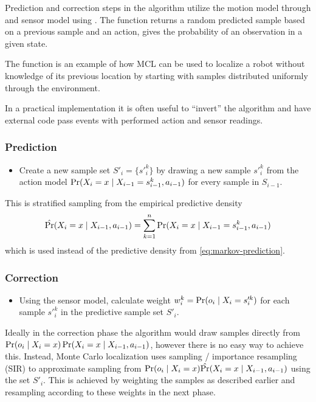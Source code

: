 Prediction and correction steps in the algorithm utilize the motion
model through \sampleFromActionModel{} and sensor model using \observationProbability{}.
The function \sampleFromActionModel{} returns a random predicted sample based on a previous sample and an action,
\observationProbability{} gives the probability of an observation in a given state.

The \initialize{} function is an example of how MCL can be used to localize
a robot without knowledge of its previous location by starting with samples distributed
uniformly through the environment.

In a practical implementation it is often useful to \enquote{invert} the algorithm and
have external code pass events with performed action and sensor readings.

\subsubsection{Prediction}
\begin{itemize}
\item
Create a new sample set \(S'_i = \{s'^k_{i}\} \)
by drawing a new sample \(s'^k_{i}\)
from the action model \(\operatorname{\mathrm{Pr}}(X_i = x \mid X_{i-1} = s^k_{i-1}, a_{i - 1})\)
for every sample in \(S_{i-1}\).
\end{itemize}

This is stratified sampling from the empirical predictive density
\begin{equation}
	\label{eq:mcl-predictive-density}
	\hat{\operatorname{\mathrm{Pr}}}(X_i = x \mid X_{i - 1}, a_{i - 1}) =
	\sum_{k = 1}^n \operatorname{\mathrm{Pr}}(X_i = x \mid X_{i-1} = s^k_{i-1}, a_{i - 1})
\end{equation}
which is used instead of the predictive density from \eqref{eq:markov-prediction}.

\subsubsection{Correction}
\begin{itemize}
\item
Using the sensor model, calculate weight \(w^k_i = \operatorname{\mathrm{Pr}}(o_i \mid X_i = s'^k_i)\)
for each sample \(s'^k_i\) in the predictive sample set \(S'_i\).
\end{itemize}

Ideally in the correction phase the algorithm would draw samples directly from
\(\operatorname{\mathrm{Pr}}(o_i \mid X_i = x) \operatorname{\mathrm{Pr}}(X_i = x \mid X_{i - 1}, a_{i - 1})\),
however there is no easy way to achieve this.
Instead, Monte Carlo localization 
uses sampling / importance resampling (SIR) \cite{smith92}
to approximate sampling from
\(\operatorname{\mathrm{Pr}}(o_i \mid X_i = x) \hat{\operatorname{\mathrm{Pr}}}(X_i = x \mid X_{i - 1}, a_{i - 1})\) using the set \(S'_i\).
This is achieved by weighting the samples as described earlier and resampling
according to these weights in the next phase.

